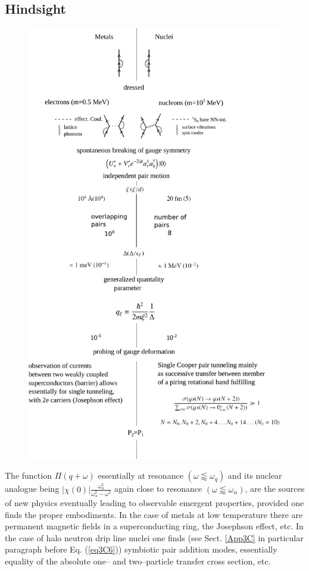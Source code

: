 \begin{subappendices}
\subsection{Hindsight}
         \begin{figure}
         	\centerline{\includegraphics*[width=14cm,angle=0	]{nutshell/figs/fig3B4x}}
         	\caption{}\label{fig3B4x}
         \end{figure}
The function $\Pi(q+\omega)$ essentially at resonance $(\omega\lessapprox\omega_q)$ and its nuclear analogue being $|\chi(0)|\frac{\omega_\alpha^2}{\omega_\alpha^2-\omega^2}$ again close to resonance $(\omega\lessapprox\omega_\alpha)$, are the sources of new physics eventually leading to observable emergent properties, provided one finds the  proper embodiments. In the case of metals at low temperature there are permanent magnetic fields in a superconducting ring, the Josephson effect, etc. In the case of halo neutron drip line nuclei one finds (see Sect. \ref{App3C} in particular paragraph before Eq. (\ref{eq3C6})) symbiotic pair addition modes, essentially equality of the absolute one-- and two--particle transfer cross section, etc. 



\end{subappendices}
